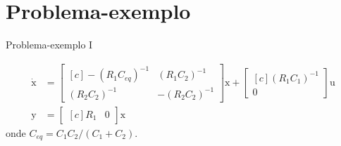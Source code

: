 \documentclass[aspectratio=169,11pt,t,xcolor={usenames,dvipsnames,x11names}]{beamer}
\begin{document}
\begin{frame}[b]
	\begin{figure}
		\centering
		
		
	\end{figure}
\end{frame}

\section{Problema-exemplo}
\begin{frame}[c]{Problema-exemplo I}
	\begin{figure}
		\centering
		
	\end{figure}
	\pause
	\begin{subequations}
  \begin{align}
    \dot{\pmb{\mathrm{x}}} &= \begin{bmatrix*}[c]
      -(R_1C_{eq})^{-1} & (R_1C_2)^{-1}\\
      (R_2C_2)^{-1} & -(R_2C_2)^{-1}
    \end{bmatrix*}\pmb{\mathrm{x}} + \begin{bmatrix*}[c]
      (R_1C_1)^{-1}\\
      0
    \end{bmatrix*}\pmb{\mathrm{u}}\label{eq:SSTCEntrada}\\
    \pmb{\mathrm{y}} &= \begin{bmatrix*}[c]
      R_1 & 0
    \end{bmatrix*}\pmb{\mathrm{x}}\label{eq:SSTCSaida}
  \end{align}
\end{subequations}
onde $C_{eq} = C_1C_2/(C_1 + C_2)$.
\end{frame}
\end{document}
